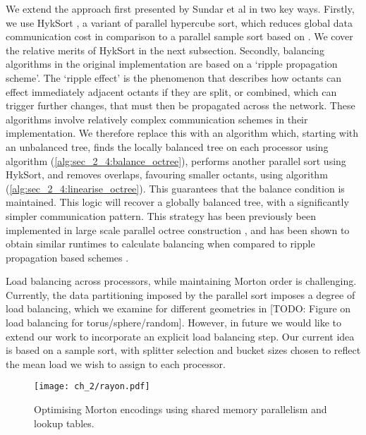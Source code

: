 We extend the approach first presented by Sundar et al in two key ways. Firstly, we use HykSort \cite{sundar2013hyksort}, a variant of parallel hypercube sort, which reduces global data communication cost in comparison to a parallel sample sort based on . We cover the relative merits of HykSort in the next subsection. Secondly, balancing algorithms in the original implementation are based on a `ripple propagation scheme'. The `ripple effect' is the phenomenon that describes how octants can effect immediately adjacent octants if they are split, or combined, which can trigger further changes, that must then be propagated across the network. These algorithms involve relatively complex communication schemes in their implementation. We therefore replace this with an algorithm which, starting with an unbalanced tree, finds the locally balanced tree on each processor using algorithm (\ref{alg:sec_2_4:balance_octree}), performs another parallel sort using HykSort, and removes overlaps, favouring smaller octants, using algorithm (\ref{alg:sec_2_4:linearise_octree}). This guarantees that the balance condition is maintained. This logic will recover a globally balanced tree, with a significantly simpler communication pattern. This strategy has been previously been implemented in large scale parallel octree construction \cite{malhotra2015pvfmm}, and has been shown to obtain similar runtimes to calculate balancing when compared to ripple propagation based schemes \cite{suh2020evaluation}.

Load balancing across processors, while maintaining Morton order is challenging. Currently, the data partitioning imposed by the parallel sort imposes a degree of load balancing, which we examine for different geometries in [TODO: Figure on load balancing for torus/sphere/random]. However, in future we would like to extend our work to incorporate an explicit load balancing step. Our current idea is based on a sample sort, with splitter selection and bucket sizes chosen to reflect the mean load we wish to assign to each processor.

\begin{figure}
    \centerline{\texttt{[image: ch\_2/rayon.pdf]}}
    \caption{Optimising Morton encodings using shared memory parallelism and lookup tables.}
    \label{fig:sec_2_4:rayon}
\end{figure}

